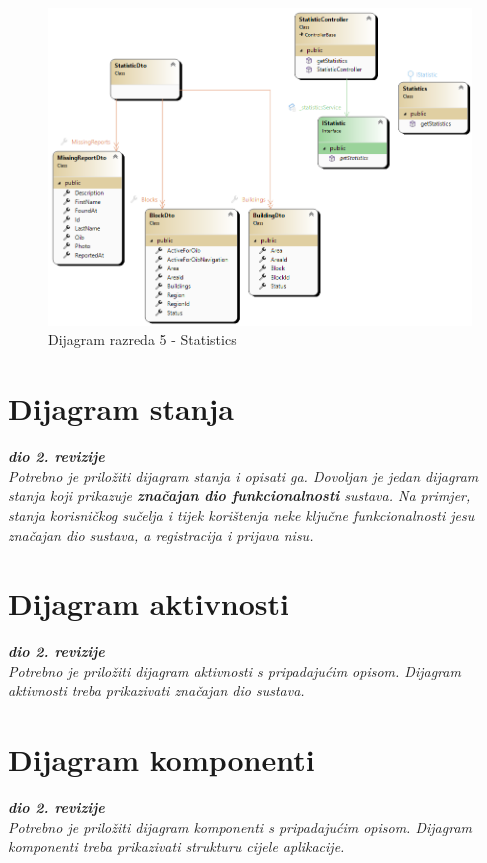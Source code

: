 			\begin{figure}[h!] \includegraphics[width=\linewidth]{dijagrami/CD-Statistics.png}
				\caption{Dijagram razreda 5 - Statistics}
			\end{figure}
					
			\eject
		
		\section{Dijagram stanja}
			
			
			\textbf{\textit{dio 2. revizije}}\\
			
			\textit{Potrebno je priložiti dijagram stanja i opisati ga. Dovoljan je jedan dijagram stanja koji prikazuje \textbf{značajan dio funkcionalnosti} sustava. Na primjer, stanja korisničkog sučelja i tijek korištenja neke ključne funkcionalnosti jesu značajan dio sustava, a registracija i prijava nisu. }
			
			
			\eject 
		
		\section{Dijagram aktivnosti}
			
			\textbf{\textit{dio 2. revizije}}\\
			
			 \textit{Potrebno je priložiti dijagram aktivnosti s pripadajućim opisom. Dijagram aktivnosti treba prikazivati značajan dio sustava.}
			
			\eject
		\section{Dijagram komponenti}
		
			\textbf{\textit{dio 2. revizije}}\\
		
			 \textit{Potrebno je priložiti dijagram komponenti s pripadajućim opisom. Dijagram komponenti treba prikazivati strukturu cijele aplikacije.}
